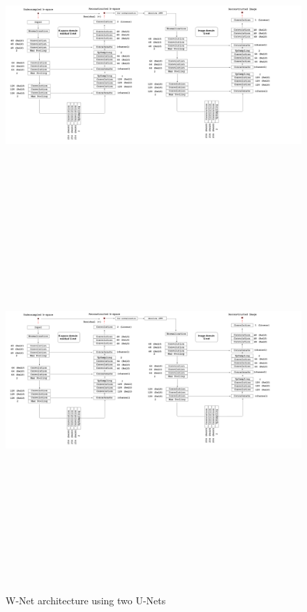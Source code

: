 \begin{figure}[!htbp]
  \begin{center}
    \leavevmode
    \ifpdf
      \includegraphics[height=3in]{Chapter1/Chapter1Figs/w-net.png}
    \else
      \includegraphics[bb = 92 86 545 742, height=6in]{Chapter1/Chapter1Figs/w-net.png}
    \fi
    \caption{W-Net architecture using two U-Nets \cite{8919674}}
    \label{W-Net model}
  \end{center}
\end{figure}

